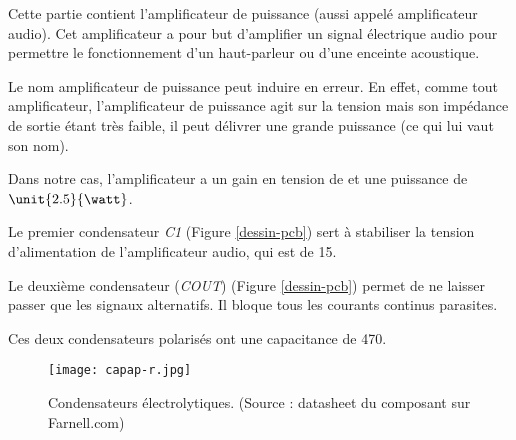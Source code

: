 Cette partie contient l'amplificateur de puissance (aussi appelé amplificateur audio). 
Cet amplificateur a pour but d'amplifier un signal électrique audio pour
permettre le fonctionnement d'un haut-parleur ou d'une enceinte acoustique.

Le nom amplificateur de puissance peut induire en erreur. En effet, comme tout amplificateur,
l'amplificateur de puissance agit sur la tension mais son impédance de sortie étant très faible,
il peut délivrer une grande puissance (ce qui lui vaut son nom).

Dans notre cas, l'amplificateur a un gain en tension de  et une puissance de $\unit
{2.5}{\watt}$.

Le premier condensateur \textit{C1} (Figure \ref{dessin-pcb}) sert à stabiliser la tension 
d'alimentation de l'amplificateur audio, qui est de \unit{15}{\volt}. 

Le deuxième condensateur (\textit{COUT}) (Figure \ref{dessin-pcb}) permet de ne laisser passer 
que les signaux alternatifs. Il bloque tous les courants continus parasites.

Ces deux condensateurs polarisés ont une capacitance de \unit{470}{\micro\farad}. 

\begin{figure}[!htb]
	\centering
	\texttt{[image: capap-r.jpg]}
	\caption{Condensateurs électrolytiques. (Source : datasheet du composant sur Farnell.com)}
\end{figure}


